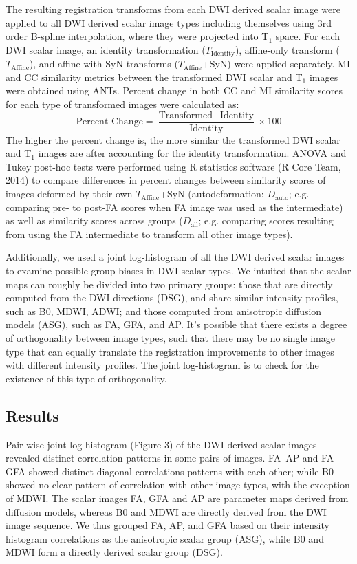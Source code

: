 The resulting registration transforms from each DWI derived scalar image were applied to all DWI derived scalar image types including themselves using 3rd order B-spline interpolation, where they were projected into T$_1$ space. For each DWI scalar image, an identity transformation ($T_{\text{Identity}}$), affine-only transform ($T_{\text{Affine}}$), and affine with SyN transforms ($T_{\text{Affine}}$+SyN) were applied separately. MI and CC similarity metrics between the transformed DWI scalar and T$_1$ images were obtained using ANTs. Percent change in both CC and MI similarity scores for each type of transformed images were calculated as:
\begin{equation}
\text{Percent Change} = \frac{\text{Transformed} - \text{Identity}}{\text{Identity}} \times 100
\end{equation}
The higher the percent change is, the more similar the transformed DWI scalar and T$_1$ images are after accounting for the identity transformation.
ANOVA and Tukey post-hoc tests were performed using R statistics software (R Core Team, 2014) to compare differences in percent changes between similarity scores of images deformed by their own $T_{\text{Affine}}$+SyN (autodeformation: $D_{\text{auto}}$; e.g. comparing pre- to post-FA scores when FA image was used as the intermediate) as well as similarity scores across groups ($D_{\text{all}}$; e.g. comparing scores resulting from using the FA intermediate to transform all other image types). 

Additionally, we used a joint log-histogram of all the DWI derived scalar images to examine possible group biases in DWI scalar types. We intuited that the scalar maps can roughly be divided into two primary groups: those that are directly computed from the DWI directions (DSG), and share similar intensity profiles, such as B0, MDWI, ADWI; and those computed from anisotropic diffusion models (ASG), such as FA, GFA, and AP. It’s possible that there exists a degree of orthogonality between image types, such that there may be no single image type that can equally translate the registration improvements to other images with different intensity profiles. The joint log-histogram is to check for the existence of this type of orthogonality. 

\subsection{Results}
Pair-wise joint log histogram (Figure 3) of the DWI derived scalar images revealed distinct correlation patterns in some pairs of images. FA–AP and FA–GFA showed distinct diagonal correlations patterns with each other; while B0 showed no clear pattern of correlation with other image types, with the exception of MDWI. The scalar images FA, GFA and AP are parameter maps derived from diffusion models, whereas B0 and MDWI are directly derived from the DWI image sequence. We thus grouped FA, AP, and GFA based on their intensity histogram correlations as the anisotropic scalar group (ASG), while B0 and MDWI form a directly derived scalar group (DSG). 

